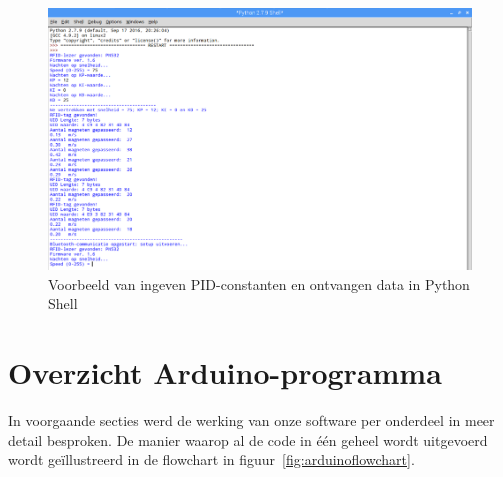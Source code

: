 \begin{figure}[H]
	\centering
	\includegraphics[width=\textwidth]{bluetoothoutputvoorbeeldbijgesneden.png}
	\caption{Voorbeeld van ingeven PID-constanten en ontvangen data in Python Shell\label{fig:bluetoothoutput}}
\end{figure}

\section{Overzicht Arduino-programma}
In voorgaande secties werd de werking van onze software per onderdeel in meer detail besproken. De manier waarop al de code in \'e\'en geheel wordt uitgevoerd wordt ge\"illustreerd in de flowchart in figuur~\vref{fig:arduinoflowchart}.

